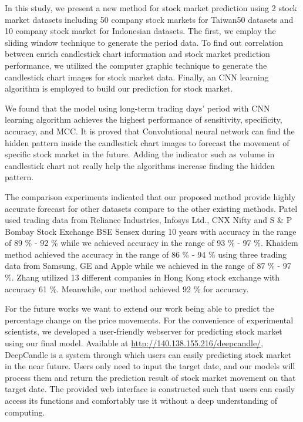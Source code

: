 \documentclass[12pt]{article}
\begin{document}
In this study, we present a new method for stock market prediction using 2 stock market datasets including 50 company stock markets for Taiwan50 datasets and 10 company stock market for Indonesian datasets. The first, we employ the sliding window technique to generate the period data. To find out correlation between enrich candlestick chart information and stock market prediction performance, we utilized the computer graphic technique to generate the candlestick chart images for stock market data. Finally, an CNN learning algorithm is employed to build our prediction for stock market.
\par
We found that the model using long-term trading days’ period with CNN learning algorithm achieves the highest performance of sensitivity, specificity, accuracy, and MCC. It is proved that Convolutional neural network can find the hidden pattern inside the candlestick chart images to forecast the movement of specific stock market in the future. Adding the indicator such as volume in candlestick chart not really help the algorithms increase finding the hidden pattern.
\par
The comparison experiments indicated that our proposed method provide highly accurate forecast for other datasets compare to the other existing methods. Patel used trading data from Reliance Industries, Infosys Ltd., CNX Nifty and S \& P Bombay Stock Exchange BSE Sensex during 10 years with accuracy in the range of 89 \% - 92 \% while we achieved accuracy in the range of 93 \% - 97 \%. Khaidem method achieved the accuracy in the range of 86 \% - 94 \% using three trading data from Samsung, GE and Apple while we achieved in the range of 87 \% - 97 \%. Zhang utilized 13 different companies in Hong Kong stock exchange with accuracy 61 \%. Meanwhile, our method achieved 92 \% for accuracy. 
\par
For the future works we want to extend our work being able to predict the percentage change on the price movements. For the convenience of experimental scientists, we developed a user-friendly webserver for predicting stock market using our final model. Available at \url{http://140.138.155.216/deepcandle/}, DeepCandle is a system through which users can easily predicting stock market in the near future. Users only need to input the target date, and our models will process them and return the prediction result of stock market movement on that target date. The provided web interface is constructed such that users can easily access its functions and comfortably use it without a deep understanding of computing.




\end{document}

